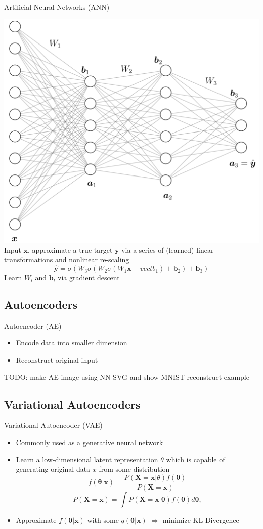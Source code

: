 \documentclass{beamer}
\newcommand{\vect}[1]{\boldsymbol{#1}}
\theoremstyle{definition}
\begin{document}
\begin{frame}{Artificial Neural Networks (ANN)}
\begin{center}
  \includegraphics[width=.55\textwidth]{../img/ffn_visual.png}
Input $\vect x$, approximate a true target $\vect y$ via a series of (learned) linear transformations and nonlinear re-scaling
\[\hat{\vect y} = \sigma(W_3\sigma(W_2\sigma(W_1 \vect x + vect b_1) + \vect b_2) + \vect b_3)\]
Learn $W_l$ and $\vect b_l$ via gradient descent
\end{center}
\end{frame}

\subsection{Autoencoders}

\begin{frame}{Autoencoder (AE)}
\begin{itemize}
  \item Encode data into smaller dimension
  \item Reconstruct original input
\end{itemize}
  TODO: make AE image using NN SVG and show MNIST reconstruct example
\end{frame}

\subsection{Variational Autoencoders}
\begin{frame}{Variational Autoencoder (VAE)}
\begin{itemize}
\item Commonly used as a generative neural network
\item Learn a low-dimensional latent representation $\theta$ which is capable of generating original data $x$ from some distribution
\[
f(\boldsymbol{\theta} | \boldsymbol{x})=\frac{P(\boldsymbol{X}=\boldsymbol{x}| \theta) f(\boldsymbol{\theta})}{P(\boldsymbol{X}=\boldsymbol{x})}
\]
\begin{equation}\label{marginal}
{P(\boldsymbol{X}=\boldsymbol{x})=\int P(\boldsymbol{X}=\boldsymbol{x}| \boldsymbol{\theta}) f(\boldsymbol{\theta})d\boldsymbol{\theta}},\nonumber
\end{equation}
\item<2-> Approximate $f(\boldsymbol{\theta} | \boldsymbol{x})$ with some $q(\boldsymbol{\theta} | \boldsymbol{x})$ $\Rightarrow$ minimize KL Divergence
\end{itemize}
\end{frame}
\end{document}
